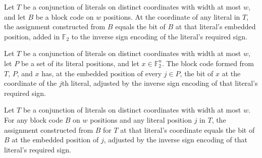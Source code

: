\begin{theorem}
\label{FABL.DNFTerm.assignmentOfBlock_literal}
\leanok
{}
Let $T$ be a conjunction of literals on distinct coordinates with width at most $w$, and
let $B$ be a block code on $w$ positions. At the coordinate of any literal in $T$, the
assignment constructed from $B$ equals the bit of $B$ at that literal's embedded
position, added in $\mathbb{F}_2$ to the inverse sign encoding of the literal's required
sign.
\end{theorem}

\begin{theorem}
\label{FABL.DNFTerm.blockCode_bits}
\leanok
{}
Let $T$ be a conjunction of literals on distinct coordinates with width at most $w$, let
$P$ be a set of its literal positions, and let $x\in\mathbb{F}_2^n$. The block code
formed from $T$, $P$, and $x$ has, at the embedded position of every $j\in P$, the bit
of $x$ at the coordinate of the $j$th literal, adjusted by the inverse sign encoding of
that literal's required sign.
\end{theorem}

\begin{theorem}
\label{FABL.DNFTerm.assignmentOfBlock_blockCode_literal}
\leanok
{}
Let $T$ be a conjunction of literals on distinct coordinates with width at most $w$. For
any block code $B$ on $w$ positions and any literal position $j$ in $T$, the assignment
constructed from $B$ for $T$ at that literal's coordinate equals the bit of $B$ at the
embedded position of $j$, adjusted by the inverse sign encoding of that literal's
required sign.
\end{theorem}

